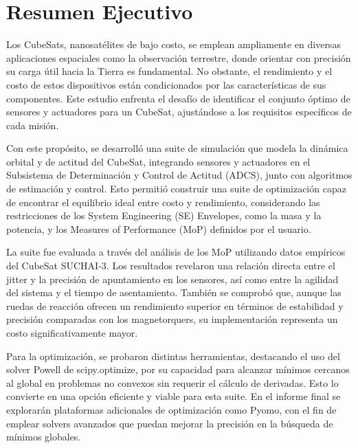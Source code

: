 \section*{Resumen Ejecutivo}

Los CubeSats, nanosatélites de bajo costo, se emplean ampliamente en diversas aplicaciones espaciales como la observación terrestre, donde orientar con precisión su carga útil hacia la Tierra es fundamental. No obstante, el rendimiento y el costo de estos dispositivos están condicionados por las características de sus componentes. Este estudio enfrenta el desafío de identificar el conjunto óptimo de sensores y actuadores para un CubeSat, ajustándose a los requisitos específicos de cada misión.

Con este propósito, se desarrolló una suite de simulación que modela la dinámica orbital y de actitud del CubeSat, integrando sensores y actuadores en el Subsistema de Determinación y Control de Actitud (ADCS), junto con algoritmos de estimación y control. Esto permitió construir una suite de optimización capaz de encontrar el equilibrio ideal entre costo y rendimiento, considerando las restricciones de los System Engineering (SE) Envelopes, como la masa y la potencia, y los Measures of Performance (MoP) definidos por el usuario.

La suite fue evaluada a través del análisis de los MoP utilizando datos empíricos del CubeSat SUCHAI-3. Los resultados revelaron una relación directa entre el jitter y la precisión de apuntamiento en los sensores, así como entre la agilidad del sistema y el tiempo de asentamiento. También se comprobó que, aunque las ruedas de reacción ofrecen un rendimiento superior en términos de estabilidad y precisión comparadas con los magnetorquers, su implementación representa un costo significativamente mayor.

Para la optimización, se probaron distintas herramientas, destacando el uso del solver Powell de scipy.optimize, por su capacidad para alcanzar mínimos cercanos al global en problemas no convexos sin requerir el cálculo de derivadas. Esto lo convierte en una opción eficiente y viable para esta suite. En el informe final se explorarán plataformas adicionales de optimización como Pyomo, con el fin de emplear solvers avanzados que puedan mejorar la precisión en la búsqueda de mínimos globales.



